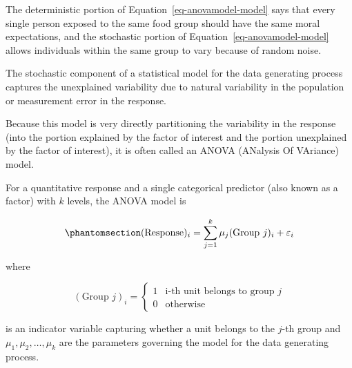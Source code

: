 \documentclass[
  letterpaper,
  DIV=11,
  numbers=noendperiod]{scrreprt}
\theoremstyle{definition}
\theoremstyle{definition}
\theoremstyle{plain}
\theoremstyle{remark}
\begin{document}
The deterministic portion of Equation~\ref{eq-anovamodel-model} says
that every single person exposed to the same food group should have the
same moral expectations, and the stochastic portion of
Equation~\ref{eq-anovamodel-model} allows individuals within the same
group to vary because of random noise.

\begin{tcolorbox}[enhanced jigsaw, colbacktitle=quarto-callout-tip-color!10!white, colback=white, left=2mm, title=\textcolor{quarto-callout-tip-color}{\faLightbulb}\hspace{0.5em}{Big Idea}, toptitle=1mm, leftrule=.75mm, breakable, bottomrule=.15mm, arc=.35mm, rightrule=.15mm, toprule=.15mm, coltitle=black, opacityback=0, colframe=quarto-callout-tip-color-frame, opacitybacktitle=0.6, bottomtitle=1mm, titlerule=0mm]

The stochastic component of a statistical model for the data generating
process captures the unexplained variability due to natural variability
in the population or measurement error in the response.

\end{tcolorbox}

Because this model is very directly partitioning the variability in the
response (into the portion explained by the factor of interest and the
portion unexplained by the factor of interest), it is often called an
ANOVA (ANalysis Of VAriance) model.

\begin{tcolorbox}[enhanced jigsaw, colbacktitle=quarto-callout-important-color!10!white, colback=white, left=2mm, title=\textcolor{quarto-callout-important-color}{\faExclamation}\hspace{0.5em}{ANOVA Model}, toptitle=1mm, leftrule=.75mm, breakable, bottomrule=.15mm, arc=.35mm, rightrule=.15mm, toprule=.15mm, coltitle=black, opacityback=0, colframe=quarto-callout-important-color-frame, opacitybacktitle=0.6, bottomtitle=1mm, titlerule=0mm]

For a quantitative response and a single categorical predictor (also
known as a factor) with \(k\) levels, the ANOVA model is

\begin{equation}\phantomsection\label{eq-anova}{(\text{Response})_i = \sum_{j = 1}^{k} \mu_j (\text{Group } j)_i + \varepsilon_i}\end{equation}

where

\[(\text{Group } j)_i = \begin{cases} 1 & \text{i-th unit belongs to group } j \\ 0 & \text{otherwise} \end{cases}\]

is an indicator variable capturing whether a unit belongs to the
\(j\)-th group and \(\mu_1, \mu_2, \dotsc, \mu_k\) are the parameters
governing the model for the data generating process.

\end{tcolorbox}
\end{document}
